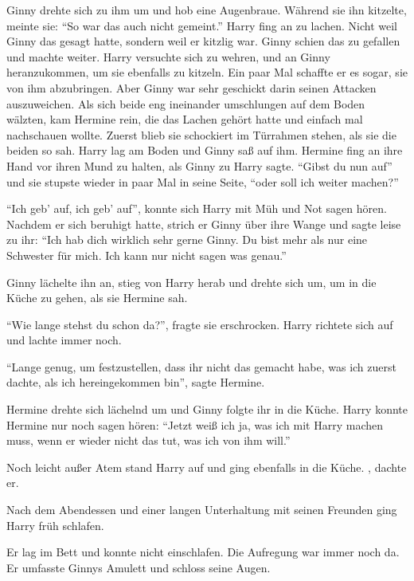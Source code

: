 Ginny drehte sich zu ihm um und hob eine Augenbraue. Während sie ihn kitzelte, meinte sie: \enquote{So war das auch nicht gemeint.} Harry fing an zu lachen. Nicht weil Ginny das gesagt hatte, sondern weil er  kitzlig war. Ginny schien das zu gefallen und machte weiter. Harry versuchte sich zu wehren, und an Ginny heranzukommen, um sie ebenfalls zu kitzeln. Ein paar Mal schaffte er es sogar, sie von ihm abzubringen. Aber Ginny war sehr geschickt darin seinen Attacken auszuweichen. Als sich beide eng ineinander umschlungen auf dem Boden wälzten, kam Hermine rein, die das Lachen gehört hatte und einfach mal nachschauen wollte. Zuerst blieb sie schockiert im Türrahmen stehen, als sie die beiden so sah. Harry lag am Boden und Ginny saß auf ihm. Hermine fing an ihre Hand vor ihren Mund zu halten, als Ginny zu Harry sagte. \enquote{Gibst du nun auf} und sie stupste wieder in paar Mal in seine Seite, \enquote{oder soll ich weiter machen?}

\enquote{Ich geb’ auf, ich geb’ auf}, konnte sich Harry mit Müh und Not sagen hören. Nachdem er sich beruhigt hatte, strich er Ginny über ihre Wange und sagte leise zu ihr: \enquote{Ich hab dich wirklich sehr gerne Ginny. Du bist mehr als nur eine Schwester für mich. Ich kann nur nicht sagen was genau.}

Ginny lächelte ihn an, stieg von Harry herab und drehte sich um, um in die Küche zu gehen, als sie Hermine sah.

\enquote{Wie lange stehst du schon da?}, fragte sie erschrocken. Harry richtete sich auf und lachte immer noch.

\enquote{Lange genug, um festzustellen, dass ihr nicht das gemacht habe, was ich zuerst dachte, als ich hereingekommen bin}, sagte Hermine.

Hermine drehte sich lächelnd um und Ginny folgte ihr in die Küche. Harry konnte Hermine nur noch sagen hören: \enquote{Jetzt weiß ich ja, was ich mit Harry machen muss, wenn er wieder nicht das tut, was ich von ihm will.}

Noch leicht außer Atem stand Harry auf und ging ebenfalls in die Küche. , dachte er.

Nach dem Abendessen und einer langen Unterhaltung mit seinen Freunden ging Harry früh schlafen.

Er lag im Bett und konnte nicht einschlafen. Die Aufregung war immer noch da. Er umfasste Ginnys Amulett und schloss seine Augen.

